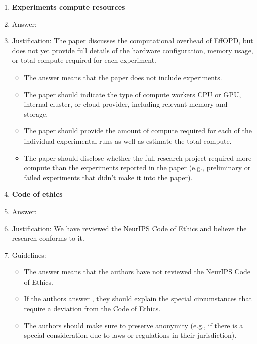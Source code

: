 \documentclass{article}
\begin{document}
\begin{enumerate}
\item {\bf Experiments compute resources}
    \item[] Answer: \answerNo{}
    \item[] Justification: The paper discusses the computational overhead of EffOPD, but does not yet provide full details of the hardware configuration, memory usage, or total compute required for each experiment.
    \begin{itemize}
        \item The answer \answerNA{} means that the paper does not include experiments.
        \item The paper should indicate the type of compute workers CPU or GPU, internal cluster, or cloud provider, including relevant memory and storage.
        \item The paper should provide the amount of compute required for each of the individual experimental runs as well as estimate the total compute. 
        \item The paper should disclose whether the full research project required more compute than the experiments reported in the paper (e.g., preliminary or failed experiments that didn't make it into the paper). 
    \end{itemize}


\item {\bf Code of ethics}
    \item[] Answer: \answerYes{}
    \item[] Justification: We have reviewed the NeurIPS Code of Ethics and believe the research conforms to it.
    \item[] Guidelines:
    \begin{itemize}
        \item The answer \answerNA{} means that the authors have not reviewed the NeurIPS Code of Ethics.
        \item If the authors answer \answerNo, they should explain the special circumstances that require a deviation from the Code of Ethics.
        \item The authors should make sure to preserve anonymity (e.g., if there is a special consideration due to laws or regulations in their jurisdiction).
    \end{itemize}


\end{enumerate}
\end{document}
